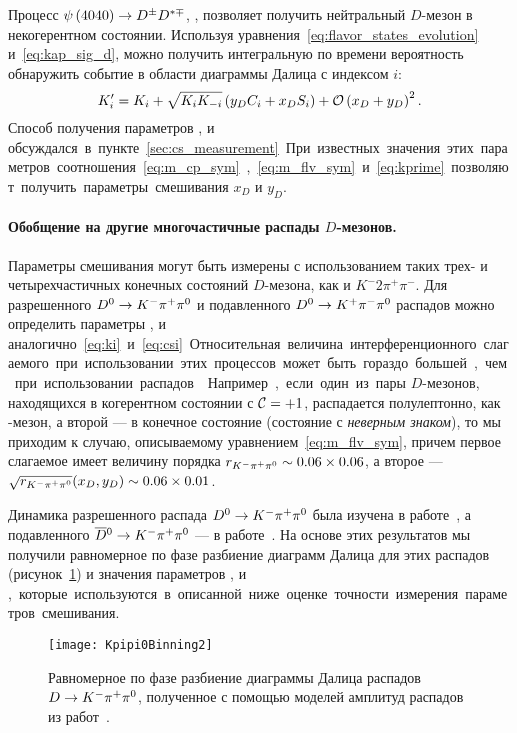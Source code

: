 Процесс $\psi\left(4040\right)\to D^{\pm}D^{*\mp}$, \dstpdpip, \dnkpp позволяет получить нейтральный $D$-мезон в некогерентном состоянии.  Используя уравнения~\eqref{eq:flavor_states_evolution} и~\eqref{eq:kap_sig_d}, можно получить интегральную по времени вероятность обнаружить событие в области диаграммы Далица с индексом $i$:
\begin{equation}\label{eq:kprime}
 K_i^{\prime} = K_i + \sqrt{K_iK_{-i}}\left( y_DC_i + x_DS_i\right) + \mathcal{O}\left(x_D+y_D\right)^2.
\end{equation}
Способ получения параметров \ki, \ci и \si обсуждался в пункте~\ref{sec:cs_measurement}.  При известных значения этих параметров соотношения~\eqref{eq:m_cp_sym}, \eqref{eq:m_flv_sym} и \eqref{eq:kprime} позволяют получить параметры смешивания $x_D$ и $y_D$.

\paragraph{Обобщение на другие многочастичные распады $D$-мезонов. } Параметры смешивания могут быть измерены с использованием таких трех- и четырехчастичных конечных состояний $D$-мезона, как \kppn и $K^-2\pi^+\pi^-$.  Для разрешенного $D^0\to K^-\pi^+\pi^0$ и подавленного $D^0\to K^+\pi^-\pi^0$ распадов можно определить параметры \ki, \ci и \si аналогично~\eqref{eq:ki} и~\eqref{eq:csi}.  Относительная величина интерференционного слагаемого при использовании этих процессов может быть гораздо большей, чем при использовании распадов \dkpp.  Например, если один из пары $D$-мезонов, находящихся в когерентном состоянии с $\mathcal{C}=+1$, распадается полулептонно, как \dn-мезон, а второй --- в конечное состояние \kppn (состояние с \emph{неверным знаком}), то мы приходим к случаю, описываемому уравнением~\eqref{eq:m_flv_sym}, причем первое слагаемое имеет величину порядка $r_{K^-\pi^+\pi^0} \sim 0.06\times 0.06$, а второе --- $\sqrt{r_{K^-\pi^+\pi^0}}(x_D,y_D)\sim 0.06\times 0.01$.

Динамика разрешенного распада $D^0\to K^-\pi^+\pi^0$ была изучена в работе~\cite{CLEO_kpipi0}, а подавленного $\overline{D}{}^0\to K^-\pi^+\pi^0$ --- в работе~\cite{babar_ws_kpipi0}.  На основе этих результатов мы получили равномерное по фазе разбиение диаграмм Далица для этих распадов (рисунок~\ref{fig:kpipin_binning}) и значения параметров \ki, \ci и \si, которые используются в описанной ниже оценке точности измерения параметров смешивания.

\begin{figure}[htb]
 \centering
  \texttt{[image: Kpipi0Binning2]}
 \caption{Равномерное по фазе разбиение диаграммы Далица распадов $D\to K^-\pi^+\pi^0$, полученное с помощью моделей амплитуд распадов из работ~\cite{CLEO_kpipi0,babar_ws_kpipi0}.}
 \label{fig:kpipin_binning}
\end{figure}

